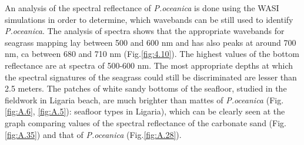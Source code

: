 \documentclass[11pt]{article}
\begin{document}
An analysis of the spectral reflectance of \textit{P.oceanica} is done using the \ac{WASI} simulations in order to determine, which wavebands can be still used to identify \textit{P.oceanica}. The analysis of spectra shows
that the appropriate wavebands for seagrass mapping lay between 500 and 600 nm and has
also peaks at around 700 nm, ca between 680 and 710 nm (Fig.\ref{fig:4.10}). The highest values of the bottom
reflectance are at spectra of 500-600 nm. The most appropriate depths at which the spectral signatures of the seagrass
could still be discriminated are lesser than 2.5 meters.
The patches of white sandy bottoms of the seafloor, studied in the fieldwork in Ligaria beach, are
much brighter than mattes of \textit{P.oceanica} (Fig.\ref{fig:A.6}, \ref{fig:A.5})\label{page-39}: seafloor types in Ligaria), which can be clearly seen
at the graph comparing values of the spectral reflectance of the carbonate sand (Fig.\ref{fig:A.35}) and that of \textit{P.oceanica} (Fig.\ref{fig:A.28}).
\end{document}
